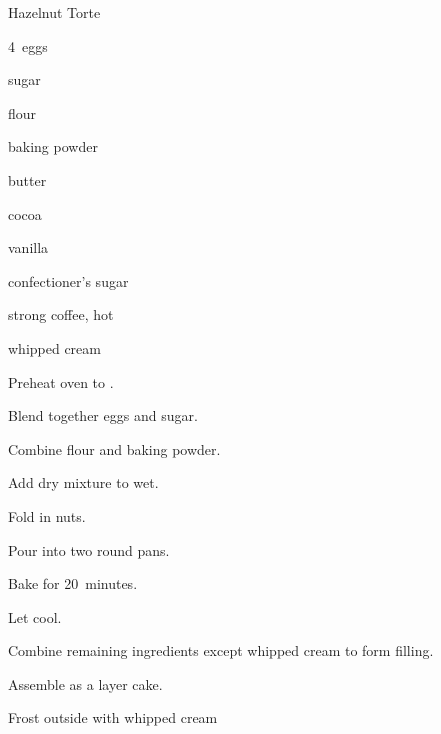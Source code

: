 \begin{recipe}{Hazelnut Torte\FIXME}{}{}

\begin{ingredients}
\item 4~eggs
\item \C{\threequarter} sugar
\item {} flour
\item \Tp{2\half} baking powder
\item {} 
\item {} butter
\item {} cocoa
\item {} vanilla
\item {} confectioner's sugar
\item {} strong coffee, hot
\item whipped cream
\end{ingredients}

\begin{directions}
\item Preheat oven to .
\item Blend together eggs and sugar.
\item Combine flour and baking powder.
\item Add dry mixture to wet.
\item Fold in nuts.
\item Pour into two  round pans.
\item Bake for 20~minutes.
\item Let cool.
\item Combine remaining ingredients except whipped cream to form filling.
\item Assemble as a layer cake.
\item Frost outside with whipped cream
\end{directions}

\end{recipe}
